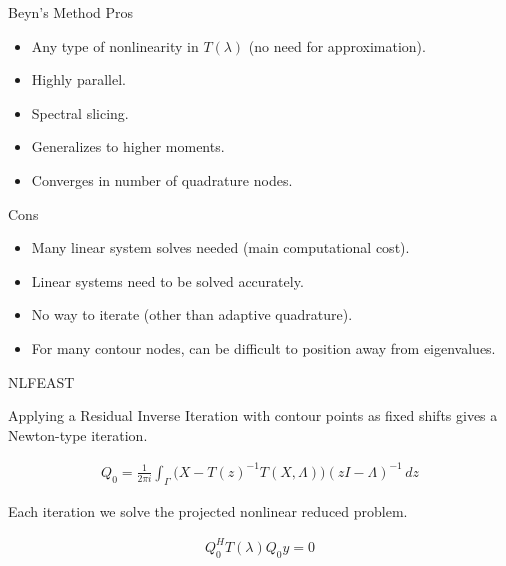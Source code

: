 \documentclass[mathserif, xcolor=table]{beamer}
\begin{document}
\begin{frame}{Beyn's Method}
	Pros
	\begin{itemize}
		\item Any type of nonlinearity in \( T(\lambda) \) (no need for approximation).
		\item Highly parallel.
		\item Spectral slicing.
		\item Generalizes to higher moments.
		\item Converges in number of quadrature nodes.
	\end{itemize}
	
	\vspace{1.5em}

	Cons
	\begin{itemize}
		\item Many linear system solves needed (main computational cost).
		\item Linear systems need to be solved accurately.
		\item No way to iterate (other than adaptive quadrature).
		\item For many contour nodes, can be difficult to position away from eigenvalues.
	\end{itemize}
\end{frame}

\begin{frame}{NLFEAST}

	Applying a Residual Inverse Iteration with contour points as fixed shifts gives a Newton-type iteration. 

	\begin{align}
		Q_0 = \frac{1}{2 \pi i } \int_\Gamma \Big(X - {T(z)}^{-1} T(X, \Lambda) \Big) {(zI - \Lambda)}^{-1} \, dz
	\end{align}
	
	\vspace{2em}

	Each iteration we solve the projected nonlinear reduced problem.

	\begin{align}
		Q_0^H T(\lambda) Q_0 y = 0
	\end{align}



\end{frame}
\end{document}
